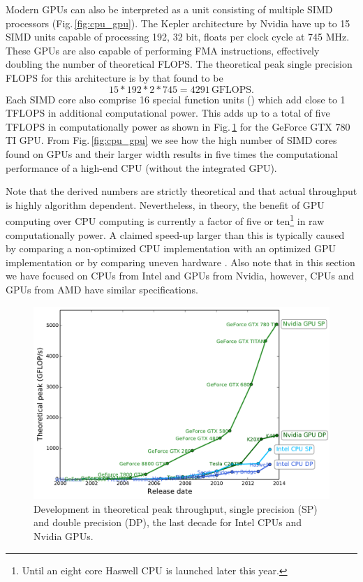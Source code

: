 Modern GPUs can also be interpreted as a unit consisting of multiple SIMD processors (Fig.\,\ref{fig:cpu_gpu}). The Kepler architecture by Nvidia have up to 15 SIMD units capable of processing 192, 32 bit, floats per clock cycle at 745 MHz. These GPUs are also capable of performing FMA instructions, effectively doubling the number of theoretical FLOPS. The theoretical peak single precision FLOPS for this architecture is by that found to be 
\begin{equation}
15*192*2*745 = 4291\,\text{GFLOPS}.
\end{equation} 
Each SIMD core also comprise 16 special function units () which add close to 1 TFLOPS in additional computational power. This adds up to a total of five TFLOPS in computationally power as shown in Fig.\,\ref{fig:cpu_vs_gpu} for the GeForce GTX 780 TI GPU. From Fig.\,\ref{fig:cpu_gpu} we see how the high number of SIMD cores found on GPUs and their larger width results in five times the computational performance of a high-end CPU (without the integrated GPU). 

Note that the derived numbers are strictly theoretical and that actual throughput is highly algorithm dependent. Nevertheless, in theory, the benefit of GPU computing over CPU computing is currently a factor of five or ten\footnote{Until an eight core Haswell CPU is launched later this year.} in raw computationally power. A claimed speed-up larger than this is typically caused by comparing a non-optimized CPU implementation with an optimized GPU implementation or by comparing uneven hardware \cite{Lee2010, Kothapalli2013}. Also note that in this section we have focused on CPUs from Intel and GPUs from Nvidia, however, CPUs and GPUs from AMD have similar specifications.

\begin{figure}
\centering
\includegraphics[width=\textwidth]{img/cpu_vs_gpu.pdf}
\caption{Development in theoretical peak throughput, single precision (SP) and double precision (DP), the last decade for Intel CPUs and Nvidia GPUs.}
\label{fig:cpu_vs_gpu}
\end{figure}

